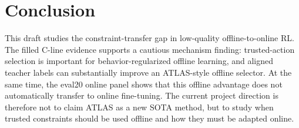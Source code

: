 \section{Conclusion}

This draft studies the constraint-transfer gap in low-quality offline-to-online RL. The filled C-line evidence supports a cautious mechanism finding: trusted-action selection is important for behavior-regularized offline learning, and aligned teacher labels can substantially improve an ATLAS-style offline selector. At the same time, the eval20 online panel shows that this offline advantage does not automatically transfer to online fine-tuning. The current project direction is therefore not to claim ATLAS as a new SOTA method, but to study when trusted constraints should be used offline and how they must be adapted online.

